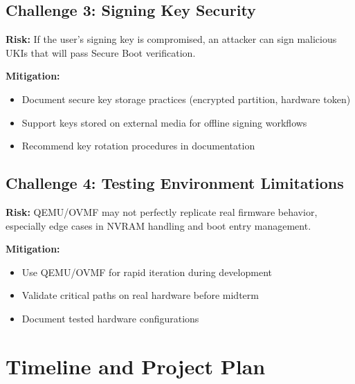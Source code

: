 \documentclass[12pt, a4paper]{article}
\begin{document}
\subsection*{Challenge 3: Signing Key Security}

\textbf{Risk:} If the user's signing key is compromised, an attacker can sign malicious UKIs that will pass Secure Boot verification.

\textbf{Mitigation:}
\begin{itemize}
    \item Document secure key storage practices (encrypted partition, hardware token)
    \item Support keys stored on external media for offline signing workflows
    \item Recommend key rotation procedures in documentation
\end{itemize}

\subsection*{Challenge 4: Testing Environment Limitations}

\textbf{Risk:} QEMU/OVMF may not perfectly replicate real firmware behavior, especially edge cases in NVRAM handling and boot entry management.

\textbf{Mitigation:}
\begin{itemize}
    \item Use QEMU/OVMF for rapid iteration during development
    \item Validate critical paths on real hardware before midterm
    \item Document tested hardware configurations
\end{itemize}

\section{Timeline and Project Plan}
\end{document}
